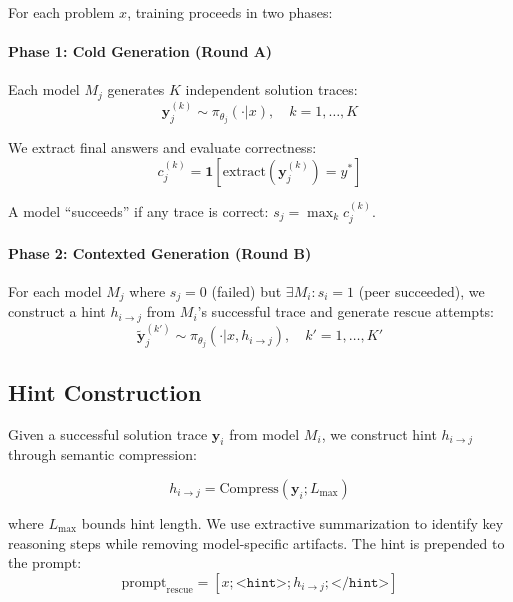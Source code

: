 \documentclass[11pt]{article}
\begin{document}
For each problem $x$, training proceeds in two phases:

\paragraph{Phase 1: Cold Generation (Round A)}
Each model $M_j$ generates $K$ independent solution traces:
\begin{equation}
    \mathbf{y}_j^{(k)} \sim \pi_{\theta_j}(\cdot | x), \quad k = 1, \ldots, K
\end{equation}

We extract final answers and evaluate correctness:
\begin{equation}
    c_j^{(k)} = \mathbf{1}[\text{extract}(\mathbf{y}_j^{(k)}) = y^*]
\end{equation}

A model ``succeeds'' if any trace is correct: $s_j = \max_k c_j^{(k)}$.

\paragraph{Phase 2: Contexted Generation (Round B)}
For each model $M_j$ where $s_j = 0$ (failed) but $\exists M_i: s_i = 1$ (peer succeeded), we construct a hint $h_{i \rightarrow j}$ from $M_i$'s successful trace and generate rescue attempts:
\begin{equation}
    \tilde{\mathbf{y}}_j^{(k')} \sim \pi_{\theta_j}(\cdot | x, h_{i \rightarrow j}), \quad k' = 1, \ldots, K'
\end{equation}

\subsection{Hint Construction}

Given a successful solution trace $\mathbf{y}_i$ from model $M_i$, we construct hint $h_{i \rightarrow j}$ through semantic compression:

\begin{equation}
    h_{i \rightarrow j} = \text{Compress}(\mathbf{y}_i; L_{\max})
\end{equation}

where $L_{\max}$ bounds hint length. We use extractive summarization to identify key reasoning steps while removing model-specific artifacts. The hint is prepended to the prompt:
\begin{equation}
    \text{prompt}_{\text{rescue}} = [x; \texttt{<hint>}; h_{i \rightarrow j}; \texttt{</hint>}]
\end{equation}
\end{document}
